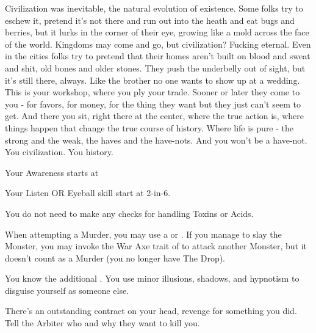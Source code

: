 {  Civilization was inevitable, the natural evolution of existence.  Some folks try to eschew it, pretend it's not there and run out into the heath and eat bugs and berries, but it lurks in the corner of their eye, growing like a mold across the face of the world.  Kingdoms may come and go, but civilization?  Fucking eternal.  Even in the cities folks try to pretend that their homes aren't built on blood and sweat and shit, old bones and older stones.  They push the underbelly out of sight, but it's still there, always.  Like the brother no one wants to show up at a wedding.  This is your workshop, where you ply your trade.  Sooner or later they come to you - for favors, for money, for the thing they want but they just can't seem to get.  And there you sit, right there at the center, where the true action is, where things happen that change the true course of history.  Where life is pure - the strong and the weak, the haves and the have-nots. And you won't be a have-not.  You   civilization.  You   history.



  Your Awareness starts at \DCUP

  Your Listen OR Eyeball skill start at 2-in-6. 


  You do not need to make any checks for handling Toxins or Acids.

  When attempting a Murder, you may use a  or .  If you manage to slay the Monster, you may invoke the War Axe trait of  to attack another Monster, but it doesn't count as a Murder (you no longer have The Drop).

  You know the additional .  You use minor illusions, shadows, and hypnotism to disguise yourself as someone else.

  There's an outstanding contract on your head, revenge for something you did.  Tell the Arbiter who and why they want to kill you.

}
